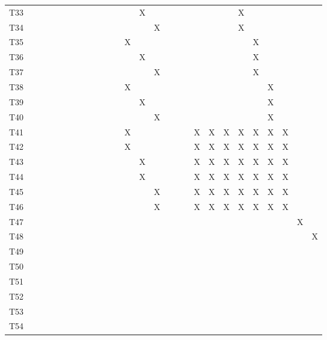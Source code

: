 \documentclass[]{article}
\begin{document}
\begin{longtable}[l]{lllllllllllllllllllllllllll}
\rowcolor{gray!6}  T33 &  &  &  &  &  &  &  &  &  &  &  &  & X &  &  &  &  &  &  &  & X &  &  &  &  & \\
T34 &  &  &  &  &  &  &  &  &  &  &  &  &  & X &  &  &  &  &  &  & X &  &  &  &  & \\
\rowcolor{gray!6}  T35 &  &  &  &  &  &  &  &  &  &  &  & X &  &  &  &  &  &  &  &  &  & X &  &  &  & \\
\addlinespace
T36 &  &  &  &  &  &  &  &  &  &  &  &  & X &  &  &  &  &  &  &  &  & X &  &  &  & \\
\rowcolor{gray!6}  T37 &  &  &  &  &  &  &  &  &  &  &  &  &  & X &  &  &  &  &  &  &  & X &  &  &  & \\
T38 &  &  &  &  &  &  &  &  &  &  &  & X &  &  &  &  &  &  &  &  &  &  & X &  &  & \\
\rowcolor{gray!6}  T39 &  &  &  &  &  &  &  &  &  &  &  &  & X &  &  &  &  &  &  &  &  &  & X &  &  & \\
T40 &  &  &  &  &  &  &  &  &  &  &  &  &  & X &  &  &  &  &  &  &  &  & X &  &  & \\
\addlinespace
\rowcolor{gray!6}  T41 &  &  &  &  &  &  &  &  &  &  &  & X &  &  &  &  &  & X & X & X & X & X & X & X &  & \\
T42 &  &  &  &  &  &  &  &  &  &  &  & X &  &  &  &  &  & X & X & X & X & X & X & X &  & \\
\rowcolor{gray!6}  T43 &  &  &  &  &  &  &  &  &  &  &  &  & X &  &  &  &  & X & X & X & X & X & X & X &  & \\
T44 &  &  &  &  &  &  &  &  &  &  &  &  & X &  &  &  &  & X & X & X & X & X & X & X &  & \\
\rowcolor{gray!6}  T45 &  &  &  &  &  &  &  &  &  &  &  &  &  & X &  &  &  & X & X & X & X & X & X & X &  & \\
\addlinespace
T46 &  &  &  &  &  &  &  &  &  &  &  &  &  & X &  &  &  & X & X & X & X & X & X & X &  & \\
\rowcolor{gray!6}  T47 &  &  &  &  &  &  &  &  &  &  &  &  &  &  &  &  &  &  &  &  &  &  &  &  & X & \\
T48 &  &  &  &  &  &  &  &  &  &  &  &  &  &  &  &  &  &  &  &  &  &  &  &  &  & X\\
\rowcolor{gray!6}  T49 &  &  &  &  &  &  &  &  &  &  &  &  &  &  &  &  &  &  &  &  &  &  &  &  &  & \\
T50 &  &  &  &  &  &  &  &  &  &  &  &  &  &  &  &  &  &  &  &  &  &  &  &  &  & \\
\addlinespace
\rowcolor{gray!6}  T51 &  &  &  &  &  &  &  &  &  &  &  &  &  &  &  &  &  &  &  &  &  &  &  &  &  & \\
T52 &  &  &  &  &  &  &  &  &  &  &  &  &  &  &  &  &  &  &  &  &  &  &  &  &  & \\
\rowcolor{gray!6}  T53 &  &  &  &  &  &  &  &  &  &  &  &  &  &  &  &  &  &  &  &  &  &  &  &  &  & \\
T54 &  &  &  &  &  &  &  &  &  &  &  &  &  &  &  &  &  &  &  &  &  &  &  &  &  & \\*
\end{longtable}
\end{document}
